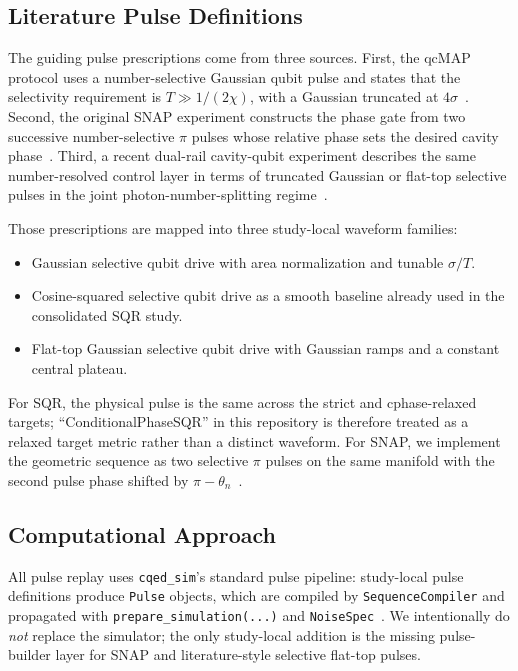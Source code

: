 \documentclass[aps,pra,twocolumn,reprint,amsmath,amssymb]{revtex4-2}
\begin{document}
\subsection{Literature Pulse Definitions}

The guiding pulse prescriptions come from three sources. First, the qcMAP protocol uses a number-selective Gaussian qubit pulse and states that the selectivity requirement is $T \gg 1/(2\chi)$, with a Gaussian truncated at $4\sigma$~\cite{leghtas2013qcmap}. Second, the original SNAP experiment constructs the phase gate from two successive number-selective $\pi$ pulses whose relative phase sets the desired cavity phase~\cite{heeres2015snap}. Third, a recent dual-rail cavity-qubit experiment describes the same number-resolved control layer in terms of truncated Gaussian or flat-top selective pulses in the joint photon-number-splitting regime~\cite{degraaf2025dualrail}.

Those prescriptions are mapped into three study-local waveform families:
\begin{itemize}
\item Gaussian selective qubit drive with area normalization and tunable $\sigma/T$.
\item Cosine-squared selective qubit drive as a smooth baseline already used in the consolidated SQR study.
\item Flat-top Gaussian selective qubit drive with Gaussian ramps and a constant central plateau.
\end{itemize}

For SQR, the physical pulse is the same across the strict and cphase-relaxed targets; ``ConditionalPhaseSQR'' in this repository is therefore treated as a relaxed target metric rather than a distinct waveform. For SNAP, we implement the geometric sequence as two selective $\pi$ pulses on the same manifold with the second pulse phase shifted by $\pi-\theta_n$~\cite{heeres2015snap}.

\subsection{Computational Approach}

All pulse replay uses \texttt{cqed\_sim}'s standard pulse pipeline: study-local pulse definitions produce \texttt{Pulse} objects, which are compiled by \texttt{SequenceCompiler} and propagated with \texttt{prepare\_simulation(...)} and \texttt{NoiseSpec}~\cite{cqed_sim}. We intentionally do \emph{not} replace the simulator; the only study-local addition is the missing pulse-builder layer for SNAP and literature-style selective flat-top pulses.
\end{document}
